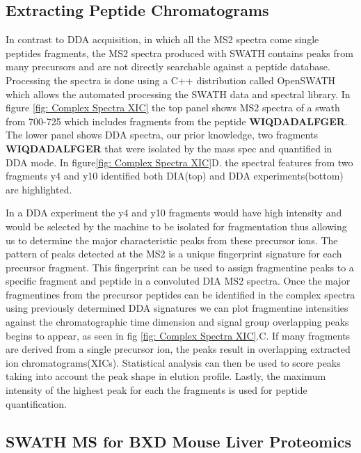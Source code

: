 \documentclass[a4paper]{book}
\begin{document}
	\subsection{Extracting Peptide Chromatograms}
	
	In contrast to DDA acquisition, in which all the MS2 spectra come single peptides fragments, the MS2 spectra produced with SWATH contains peaks from many precursors and are not directly searchable against a peptide database. Processing the spectra is done using a C++ distribution called OpenSWATH which allows the automated processing the SWATH data and spectral library\citep{Rost2014OpenSWATHData}. In figure \ref{fig: Complex Spectra XIC} the top panel shows MS2 spectra of a swath from 700-725 which includes fragments from the peptide \textbf{WIQDADALFGER}. The lower panel shows DDA spectra, our prior knowledge, two fragments \textbf{WIQDADALFGER} that were isolated by the mass spec and quantified in DDA mode. In figure\ref{fig: Complex Spectra XIC}D. the spectral features from two fragments y4 and y10 identified both DIA(top) and DDA experiments(bottom) are highlighted. 
	
	In a DDA experiment the y4 and y10 fragments would have high intensity and would be selected by the machine to be isolated for fragmentation thus allowing us to determine the major characteristic peaks from these precursor ions. The pattern of peaks detected at the MS2 is a unique fingerprint signature for each precursor fragment\citep{Gillet2012TargetedAnalysis}. This fingerprint can be used to assign fragmentine peaks to a specific fragment and peptide in a convoluted DIA MS2 spectra. Once the major fragmentines from the precursor peptides can be identified in the complex spectra using previously determined DDA signatures we can plot fragmentine intensities against the chromatographic time dimension and signal group overlapping peaks begins to appear, as seen in fig \ref{fig: Complex Spectra XIC}.C. If many fragments are derived from a single precursor ion, the peaks result in overlapping extracted ion chromatograms(XICs). Statistical analysis can then be used to score peaks taking into account the peak shape in elution profile. Lastly, the  maximum intensity of the highest peak for each the fragments is used for peptide quantification. 
	
	\subsection{SWATH MS for BXD Mouse Liver Proteomics}
	
\end{document}
